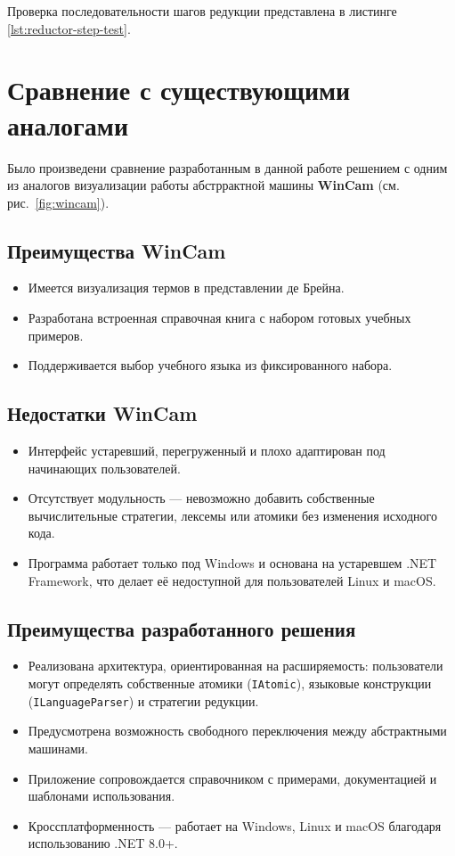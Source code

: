 \begin{itemize}
Проверка последовательности шагов редукции представлена в листинге \ref{lst:reductor-step-test}.

\section{Сравнение с существующими аналогами}
\label{sec:comparison-analogs}

Было произведени сравнение разработанным в данной работе решением с одним из аналогов визуализации работы абстррактной машины \textbf{WinCam} (см. рис.~\ref{fig:wincam}).


\subsection*{Преимущества WinCam}
\begin{itemize}
  \item Имеется визуализация термов в представлении де Брейна.
  \item Разработана встроенная справочная книга с набором готовых учебных примеров.
  \item Поддерживается выбор учебного языка из фиксированного набора.
\end{itemize}

\subsection*{Недостатки WinCam}
\begin{itemize}
  \item Интерфейс устаревший, перегруженный и плохо адаптирован под начинающих пользователей.
  \item Отсутствует модульность — невозможно добавить собственные вычислительные стратегии, лексемы или атомики без изменения исходного кода.
  \item Программа работает только под Windows и основана на устаревшем .NET Framework, что делает её недоступной для пользователей Linux и macOS.
\end{itemize}

\subsection*{Преимущества разработанного решения}
\begin{itemize}
  \item Реализована архитектура, ориентированная на расширяемость: пользователи могут определять собственные атомики (\texttt{IAtomic}), языковые конструкции (\texttt{ILanguageParser}) и стратегии редукции.
  \item Предусмотрена возможность свободного переключения между абстрактными машинами.
  \item Приложение сопровождается справочником с примерами, документацией и шаблонами использования.
  \item Кроссплатформенность — работает на Windows, Linux и macOS благодаря использованию .NET 8.0+.
\end{itemize}


\end{itemize}
